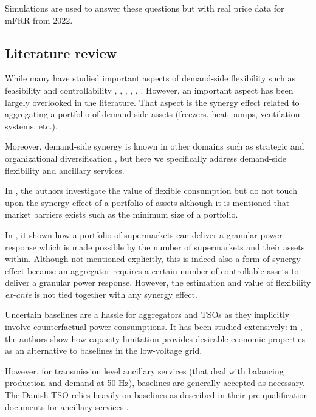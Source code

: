 \documentclass[lettersize,journal]{IEEEtran}
\begin{document}
Simulations are used to answer these questions but with real price data for mFRR from 2022.

\subsection{Literature review}

While many have studied important aspects of demand-side flexibility such as feasibility and controllability \cite{bondy2018redefining}, \cite{bondy2017performance}, \cite{bondy2016procedure}, \cite{bondy2014performance}, \cite{biegel2014integration}, \cite{AchievingControllabilityofElectricLoads}. However, an important aspect has been largely overlooked in the literature. That aspect is the synergy effect related to aggregating a portfolio of demand-side assets (freezers, heat pumps, ventilation systems, etc.).

Moreover, demand-side synergy is known in other domains such as strategic and organizational diversification \cite{ye2012achieving}, but here we specifically address demand-side flexibility and ancillary services.

In \cite{biegel2014value}, the authors investigate the value of flexible consumption but do not touch upon the synergy effect of a portfolio of assets although it is mentioned that market barriers exists such as the minimum size of a portfolio.

In \cite{pedersen2014aggregation}, it shown how a portfolio of supermarkets can deliver a granular power response which is made possible by the number of supermarkets and their assets within. Although not mentioned explicitly, this is indeed also a form of synergy effect because an aggregator requires a certain number of controllable assets to deliver a granular power response. However, the estimation and value of flexibility \textit{ex-ante} is not tied together with any synergy effect.

Uncertain baselines are a hassle for aggregators and TSOs \cite{ziras2021baselines} as they implicitly involve counterfactual power consumptions. It has been studied extensively: in \cite{capacity_limitation_services}, the authors show how capacity limitation provides desirable economic properties as an alternative to baselines in the low-voltage grid.

However, for transmission level ancillary services (that deal with balancing production and demand at 50 Hz), baselines are generally accepted as necessary. The Danish TSO relies heavily on baselines as described in their pre-qualification documents for ancillary services \cite{energinet:prequalification}.
\end{document}
